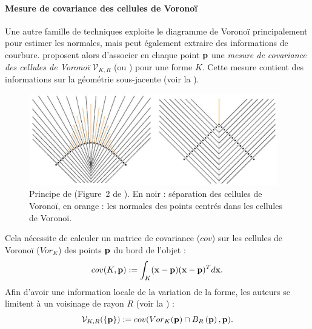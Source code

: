 \paragraph{Mesure de covariance des cellules de Voronoï}
%
Une autre famille de techniques exploite le diagramme de Voronoï
\cite{Alliez2007,Merigot2009,Merigot2011,Cuel2014DGCI} principalement pour
estimer les normales, mais peut également extraire des informations de
courbure.   proposent alors d'associer
en chaque point $\mathbf{p}$ une \emph{mesure de covariance des cellules de Voronoï}
$\mathcal{V}_{K,R}$ (\VCMM ou \VCM) pour une forme $K$. Cette mesure
contient des informations sur la géométrie sous-jacente (voir la
).
%

\begin{figure}[ht]{
    \begin{center}
    \includegraphics[height=4cm]{images/Feature/VCM}
    \end{center}}
    \caption[Principe de \VCM.]{Principe de \VCM (Figure~2 de \cite{Merigot2011}). En noir : séparation des cellules de Voronoï, en orange : les normales des points centrés dans les cellules de Voronoï.
      \label{fig:merigot-VCM-c}}
\end{figure}

Cela nécessite de calculer un matrice de covariance ($cov$) sur les cellules de
Voronoï (${Vor}_K$) des points $\mathbf{p}$ du bord de l'objet :
%
\begin{equation}
    cov(K,\mathbf{p}) := \int_K (\mathbf{x} - \mathbf{p})(\mathbf{x} - \mathbf{p})^T d\mathbf{x} .
\end{equation}
%
Afin d'avoir une information locale de la variation de la forme, les auteurs se
limitent à un voisinage de rayon $R$ (voir la ) :
%
\begin{equation}
  \mathcal{V}_{K,R}(\{\mathbf{p}\}) := cov({Vor}_K(\mathbf{p}) \cap B_{R}\left(\mathbf{p}\right), \mathbf{p}) .
\end{equation}

